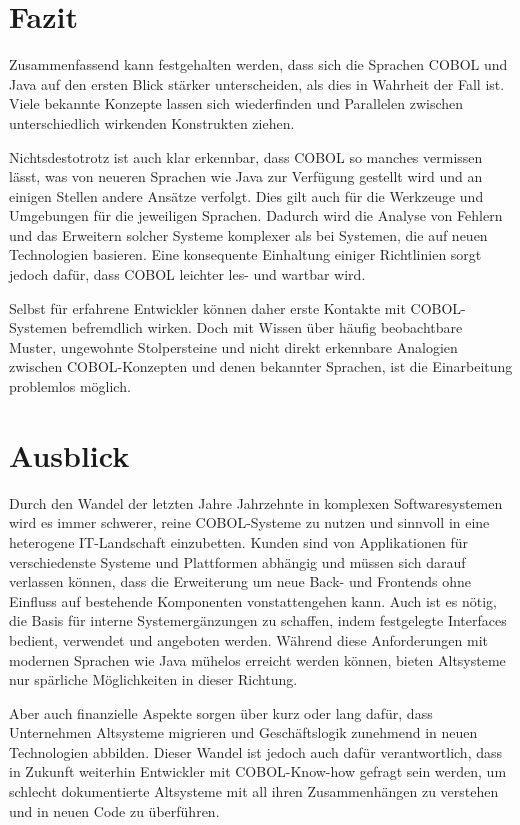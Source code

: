 \section{Fazit}

Zusammenfassend kann festgehalten werden, dass sich die Sprachen COBOL und Java auf den ersten Blick stärker unterscheiden, als dies in Wahrheit der Fall ist. Viele bekannte Konzepte lassen sich wiederfinden und Parallelen zwischen unterschiedlich wirkenden Konstrukten ziehen. 

Nichtsdestotrotz ist auch klar erkennbar, dass COBOL so manches vermissen lässt, was von neueren Sprachen wie Java zur Verfügung gestellt wird und an einigen Stellen andere Ansätze verfolgt. Dies gilt auch für die Werkzeuge und Umgebungen für die jeweiligen Sprachen. Dadurch wird die Analyse von Fehlern und das Erweitern solcher Systeme \idR komplexer als bei Systemen, die auf neuen Technologien basieren. Eine konsequente Einhaltung einiger Richtlinien sorgt jedoch dafür, dass COBOL leichter les- und wartbar wird. 

Selbst für erfahrene Entwickler können daher erste Kontakte mit COBOL-Systemen befremdlich wirken. Doch mit Wissen über häufig beobachtbare Muster, ungewohnte Stolpersteine und nicht direkt erkennbare Analogien zwischen COBOL-Konzepten und denen bekannter Sprachen, ist die Einarbeitung problemlos möglich.

\section{Ausblick}

Durch den Wandel der letzten Jahre \bzw Jahrzehnte in komplexen Softwaresystemen wird es immer schwerer, reine COBOL-Systeme zu nutzen und sinnvoll in eine heterogene IT-Landschaft einzubetten. Kunden sind von Applikationen für verschiedenste Systeme und Plattformen abhängig und müssen sich darauf verlassen können, dass die Erweiterung um neue Back- und Frontends ohne Einfluss auf bestehende Komponenten vonstattengehen kann. Auch ist es nötig, die Basis für interne Systemergänzungen zu schaffen, indem festgelegte Interfaces bedient, verwendet und angeboten werden. Während diese Anforderungen mit modernen Sprachen wie Java mühelos erreicht werden können, bieten Altsysteme nur spärliche Möglichkeiten in dieser Richtung.

Aber auch finanzielle Aspekte sorgen über kurz oder lang dafür, dass Unternehmen Altsysteme migrieren und Geschäftslogik zunehmend in neuen Technologien abbilden. Dieser Wandel ist jedoch auch dafür verantwortlich, dass in Zukunft weiterhin Entwickler mit COBOL-Know-how gefragt sein werden, um schlecht dokumentierte Altsysteme mit all ihren Zusammenhängen zu verstehen und in neuen Code zu überführen.